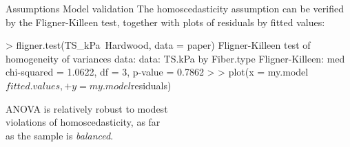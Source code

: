 \documentclass[t]{beamer}
\begin{document}
\begin{ftstf}
{Assumptions}
{Model validation}
The homoscedasticity assumption can be verified by the Fligner-Killeen test, together with plots of residuals by fitted values:
\begin{rcode}
> fligner.test(TS_kPa~Hardwood, data = paper)
Fligner-Killeen test of homogeneity of
variances
data:  data:  TS.kPa by Fiber.type
Fligner-Killeen:
med chi-squared = 1.0622, df = 3, 
p-value = 0.7862
>
> plot(x = my.model$fitted.values,
+      y = my.model$residuals) 

\end{rcode}
\vhalf
ANOVA is relatively robust to modest\\
violations of homoscedasticity, as far\\
as the sample is \textit{balanced}.
\end{ftstf}

\end{document}
